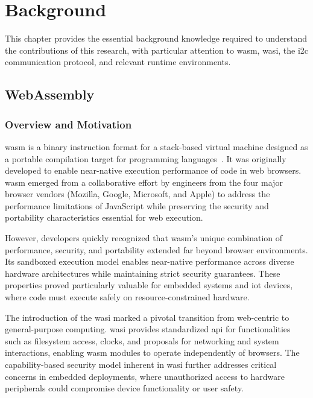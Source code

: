 \chapter{Background}
\label{chap:background}

This chapter provides the essential background knowledge required to understand the contributions of this research, with particular attention to \acrshort{wasm}, \acrshort{wasi}, the \acrshort{i2c} communication protocol, and relevant runtime environments.

\section{WebAssembly}
\label{sec:webassembly}

\subsection{Overview and Motivation}
\label{subsec:wasm-overview}

\acrfull{wasm} is a binary instruction format for a stack-based virtual machine designed as a portable compilation target for programming languages~\cite{rossberg2018webassembly, wasm_specs, w3c2022wasm2}. It was originally developed to enable near-native execution performance of code in web browsers. \acrshort{wasm} emerged from a collaborative effort by engineers from the four major browser vendors (Mozilla, Google, Microsoft, and Apple) to address the performance limitations of JavaScript while preserving the security and portability characteristics essential for web execution.

However, developers quickly recognized that \acrshort{wasm}'s unique combination of performance, security, and portability extended far beyond browser environments. Its sandboxed execution model enables near-native performance across diverse hardware architectures while maintaining strict security guarantees. These properties proved particularly valuable for embedded systems and \acrshort{iot} devices, where code must execute safely on resource-constrained hardware.

The introduction of the \acrfull{wasi} marked a pivotal transition from web-centric to general-purpose computing. \acrshort{wasi} provides standardized \acrshort{api} for functionalities such as filesystem access, clocks, and proposals for networking and system interactions, enabling \acrshort{wasm} modules to operate independently of browsers. The capability-based security model inherent in \acrshort{wasi} further addresses critical concerns in embedded deployments, where unauthorized access to hardware peripherals could compromise device functionality or user safety.


